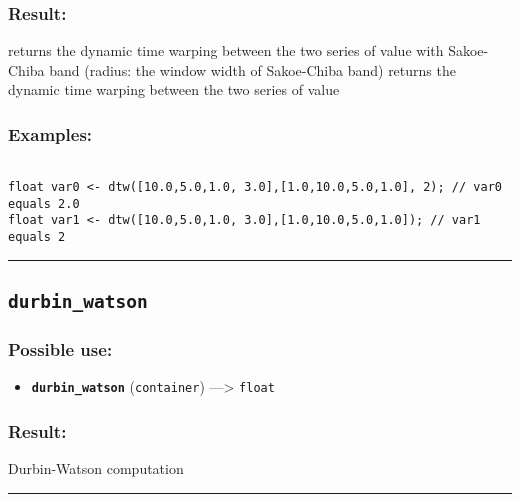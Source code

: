 \documentclass[]{book}
\providecommand{\tightlist}{%
  \setlength{\itemsep}{0pt}\setlength{\parskip}{0pt}}
\theoremstyle{definition}
\theoremstyle{definition}
\theoremstyle{definition}
\theoremstyle{remark}
\begin{document}
\subsubsection{Result:}\label{result-137}

returns the dynamic time warping between the two series of value with
Sakoe-Chiba band (radius: the window width of Sakoe-Chiba band) returns
the dynamic time warping between the two series of value

\subsubsection{Examples:}\label{examples-108}

\begin{verbatim}
 
float var0 <- dtw([10.0,5.0,1.0, 3.0],[1.0,10.0,5.0,1.0], 2); // var0 equals 2.0 
float var1 <- dtw([10.0,5.0,1.0, 3.0],[1.0,10.0,5.0,1.0]); // var1 equals 2
\end{verbatim}

\begin{center}\rule{0.5\linewidth}{\linethickness}\end{center}

\subsection{\texorpdfstring{\texttt{durbin\_watson}}{durbin\_watson}}\label{durbin_watson}

\subsubsection{Possible use:}\label{possible-use-142}

\begin{itemize}
\tightlist
\item
  \textbf{\texttt{durbin\_watson}} (\texttt{container})
  ---\textgreater{} \texttt{float}
\end{itemize}

\subsubsection{Result:}\label{result-138}

Durbin-Watson computation

\begin{center}\rule{0.5\linewidth}{\linethickness}\end{center}
\end{document}
